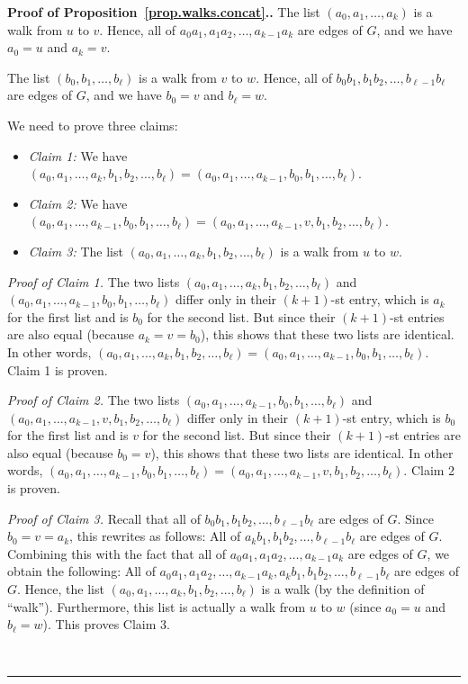 \documentclass[numbers=enddot,12pt,final,onecolumn,notitlepage]{scrartcl}%
\theoremstyle{definition}
\newenvironment{proof}[1][Proof]{\noindent\textbf{#1.} }{\ \rule{0.5em}{0.5em}}
\newcommand{\tup}[1]{\left( #1 \right)}
\begin{document}
\begin{proof}[Proof of Proposition~\ref{prop.walks.concat}.]
The list $\tup{a_0, a_1, \ldots, a_k}$ is a walk from $u$ to $v$.
Hence, all of $a_0 a_1, a_1 a_2, \ldots, a_{k-1} a_k$ are edges of
$G$, and we have $a_0 = u$ and $a_k = v$.

The list $\tup{b_0, b_1, \ldots, b_\ell}$ is a walk from $v$ to $w$.
Hence, all of $b_0 b_1, b_1 b_2, \ldots, b_{\ell-1} b_\ell$ are edges
of $G$, and we have $b_0 = v$ and $b_\ell = w$.

We need to prove three claims:
\begin{itemize}
\item \textit{Claim 1:} We have
$\tup{a_0, a_1, \ldots, a_k, b_1, b_2, \ldots, b_\ell}
= \tup{a_0, a_1, \ldots, a_{k-1}, b_0, b_1, \ldots, b_\ell}$.
\item \textit{Claim 2:} We have
$\tup{a_0, a_1, \ldots, a_{k-1}, b_0, b_1, \ldots, b_\ell}
= \tup{a_0, a_1, \ldots, a_{k-1}, v, b_1, b_2, \ldots, b_\ell}$.
\item \textit{Claim 3:} The list
$\tup{a_0, a_1, \ldots, a_k, b_1, b_2, \ldots, b_\ell}$ is a walk
from $u$ to $w$.
\end{itemize}

\textit{Proof of Claim 1.} The two lists
$\tup{a_0, a_1, \ldots, a_k, b_1, b_2, \ldots, b_\ell}$
and \newline
$\tup{a_0, a_1, \ldots, a_{k-1}, b_0, b_1, \ldots, b_\ell}$
differ only in their $\tup{k+1}$-st entry, which is $a_k$ for the
first list and is $b_0$ for the second list. But since their
$\tup{k+1}$-st entries are also equal (because $a_k = v = b_0$),
this shows that these two lists are identical. In other words,
$\tup{a_0, a_1, \ldots, a_k, b_1, b_2, \ldots, b_\ell}
= \tup{a_0, a_1, \ldots, a_{k-1}, b_0, b_1, \ldots, b_\ell}$.
Claim 1 is proven.

\textit{Proof of Claim 2.} The two lists
$\tup{a_0, a_1, \ldots, a_{k-1}, b_0, b_1, \ldots, b_\ell}$
and \newline
$\tup{a_0, a_1, \ldots, a_{k-1}, v, b_1, b_2, \ldots, b_\ell}$
differ only in their $\tup{k+1}$-st entry, which is $b_0$ for the
first list and is $v$ for the second list. But since their
$\tup{k+1}$-st entries are also equal (because $b_0 = v$),
this shows that these two lists are identical. In other words,
$\tup{a_0, a_1, \ldots, a_{k-1}, b_0, b_1, \ldots, b_\ell}
= \tup{a_0, a_1, \ldots, a_{k-1}, v, b_1, b_2, \ldots, b_\ell}$.
Claim 2 is proven.

\textit{Proof of Claim 3.} Recall that all of
$b_0 b_1, b_1 b_2, \ldots, b_{\ell-1} b_\ell$ are edges of $G$.
Since $b_0 = v = a_k$, this rewrites as follows: All of
$a_k b_1, b_1 b_2, \ldots, b_{\ell-1} b_\ell$ are edges of $G$.
Combining this with the fact that all of
$a_0 a_1, a_1 a_2, \ldots, a_{k-1} a_k$ are edges of $G$,
we obtain the following: All of
$a_0 a_1, a_1 a_2, \ldots, a_{k-1} a_k,
a_k b_1, b_1 b_2, \ldots, b_{\ell-1} b_\ell$ are edges of $G$. Hence,
the list
$\tup{a_0, a_1, \ldots, a_k, b_1, b_2, \ldots, b_\ell}$ is a walk
(by the definition of ``walk''). Furthermore, this list is actually
a walk from $u$ to $w$ (since $a_0 = u$ and $b_\ell = w$). This
proves Claim 3.


\end{proof}
\end{document}

